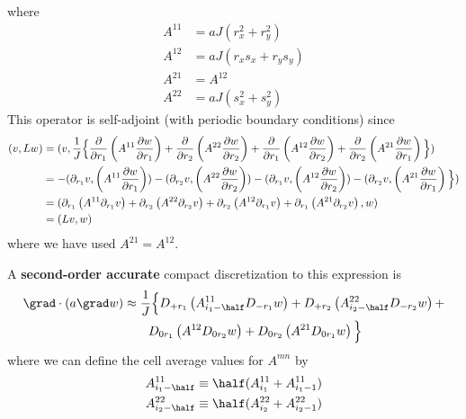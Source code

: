 \documentclass[10pt]{article}
\begin{document}
where
\begin{align*}
   A^{11} &= a J (r_x^2 + r_y^2) \\
   A^{12} &= a J (r_x s_x + r_y s_y) \\
   A^{21} &= A^{12} \\
   A^{22} &= a J (s_x^2 + s_y^2)
\end{align*}
This operator is self-adjoint (with periodic boundary conditions) since 
\begin{align*}
 (v,Lw) &= (v,{1\over J} \Big\lbrace  
        {\partial\over\partial r_1}\left( A^{11} {\partial w \over\partial r_1} \right) +
        {\partial\over\partial r_2}\left( A^{22} {\partial w \over\partial r_2} \right) + 
        {\partial\over\partial r_1}\left( A^{12} {\partial w \over\partial r_2} \right) + 
        {\partial\over\partial r_2}\left( A^{21} {\partial w \over\partial r_1} \right) \Big\rbrace) \\
    &= -( \partial_{r_1} v, \left( A^{11} {\partial w \over\partial r_1} \right) )
       -( \partial_{r_2} v, \left( A^{22} {\partial w \over\partial r_2} \right) )
       -( \partial_{r_1} v,\left( A^{12} {\partial w \over\partial r_2} \right) ) 
       -( \partial_{r_2} v, \left( A^{21} {\partial w \over\partial r_1} \right) \Big\rbrace) \\
    &= (  \partial_{r_1}\left( A^{11}\partial_{r_1} v\right)+
          \partial_{r_2}\left(A^{22} \partial_{r_2} v\right) +
          \partial_{r_2}\left(A^{12} \partial_{r_1} v\right) +
          \partial_{r_1}\left(A^{21} \partial_{r_2} v\right) , w) \\
    &= (Lv,w)
\end{align*}
where we have used $A^{21}=A^{12}$.
          




A {\bf second-order accurate} compact discretization to this expression is
\begin{align*}
  \grad\cdot( a \grad w) & \approx {1\over J} \Big\lbrace
        D_{+ r_1}\left( A^{11}_{i_1-\half}D_{- r_1}w \right) +
        D_{+ r_2}\left( A^{22}_{i_2-\half}D_{- r_2}w \right) + \\
&\qquad D_{0 r_1}\left( A^{12}            D_{0 r_2}w \right) + 
        D_{0 r_2}\left( A^{21}            D_{0 r_1}w \right) \Big\rbrace 
\end{align*}
where we can define the cell average values for $A^{mn}$ by
\begin{align*}
   A^{11}_{i_1-\half} &\equiv \half( A^{11}_{i_1}+A^{11}_{i_1-1} ) \\
   A^{22}_{i_2-\half} &\equiv \half( A^{22}_{i_2}+A^{22}_{i_2-1} )
\end{align*}
\end{document}
